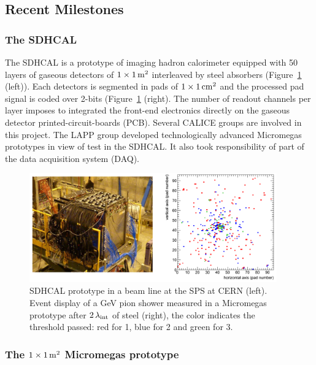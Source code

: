 \subsection{Recent Milestones}

\subsubsection{The SDHCAL}

The SDHCAL is a prototype of imaging hadron calorimeter equipped with 50 layers of gaseous detectors of $1\times \unit[1]{m^{2}}$ interleaved by steel absorbers (Figure~\ref{sdhcal} (left)). Each detectors is segmented in pads of $1\times\unit[1]{cm^{2}}$ and the processed pad signal is coded over 2-bits (Figure~\ref{sdhcal} (right). The number of readout channels per layer imposes to integrated the front-end electronics directly on the gaseous detector printed-circuit-boards (PCB). Several CALICE groups are involved in this project. The LAPP group developed technologically advanced Micromegas prototypes in view of test in the SDHCAL. It also took responsibility of part of the data acquisition system (DAQ).


\begin{figure}
\begin{centering}
\includegraphics[width=0.95\textwidth]{Calorimeter/SDHCAL/test}
\caption{SDHCAL prototype in a beam line at the SPS at CERN (left). Event display of a \unit[150]{GeV} pion shower measured in a Micromegas prototype after $\unit[2]{\lambda_{int}}$ of steel (right), the color indicates the threshold passed: red for 1, blue for 2 and green for 3.}
\label{sdhcal}
\end{centering}
\end{figure}


\subsubsection{The $1\times\unit[1]{m^{2}}$ Micromegas prototype}


